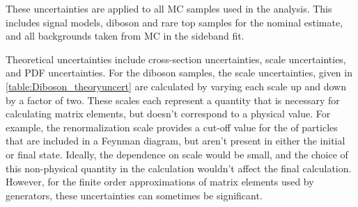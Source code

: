 These uncertainties are applied to all \ac{MC} samples used in the analysis. This includes signal models, diboson and rare top samples for the nominal estimate, and all backgrounds taken from \ac{MC} in the sideband fit. 

Theoretical uncertainties include cross-section uncertainties, scale uncertainties, and \ac{PDF} uncertainties. For the diboson samples, the scale uncertainties, given in \autoref{table:Diboson_theoryuncert} are calculated by varying each scale up and down by a factor of two. These scales each represent a quantity that is necessary for calculating matrix elements, but doesn't correspond to a physical value. For example, the renormalization scale provides a cut-off value for the \pt of particles that are included in a Feynman diagram, but aren't present in either the initial or final state. Ideally, the dependence on scale would be small, and the choice of this non-physical quantity in the calculation wouldn't affect the final calculation. However, for the finite order approximations of matrix elements used by generators, these uncertainties can sometimes be significant.

